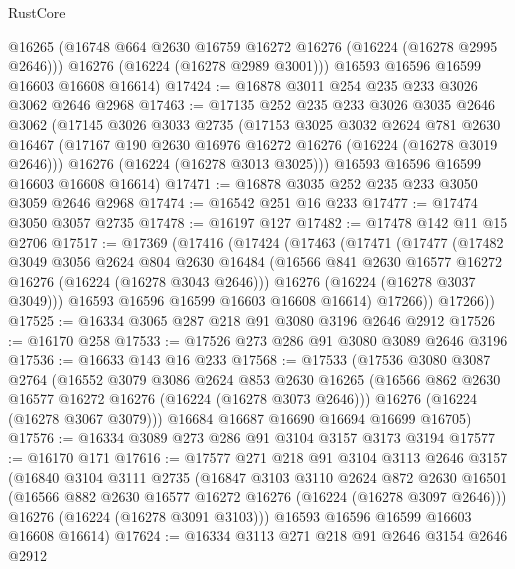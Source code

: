 \begin{lexlean}{RustCore}
\begin{coremodule}
        @16265
        (@16748 @664 @2630 @16759 @16272 @16276 (@16224 (@16278 @2995 @2646)))
        @16276
        (@16224 (@16278 @2989 @3001)))
      @16593
      @16596
      @16599
      @16603
      @16608
      @16614)
@17424 := @16878 @3011 @254 @235 @233 @3026 @3062 @2646 @2968
@17463 := @17135
    @252
    @235
    @233
    @3026
    @3035
    @2646
    @3062
    (@17145
      @3026
      @3033
      @2735
      (@17153
        @3025
        @3032
        @2624
        @781
        @2630
        @16467
        (@17167 @190 @2630 @16976 @16272 @16276 (@16224 (@16278 @3019 @2646)))
        @16276
        (@16224 (@16278 @3013 @3025)))
      @16593
      @16596
      @16599
      @16603
      @16608
      @16614)
@17471 := @16878 @3035 @252 @235 @233 @3050 @3059 @2646 @2968
@17474 := @16542 @251 @16 @233
@17477 := @17474 @3050 @3057 @2735
@17478 := @16197 @127
@17482 := @17478 @142 @11 @15 @2706
@17517 := @17369
    (@17416
      (@17424
        (@17463
          (@17471
            (@17477
              (@17482
                @3049
                @3056
                @2624
                @804
                @2630
                @16484
                (@16566 @841 @2630 @16577 @16272 @16276 (@16224 (@16278 @3043 @2646)))
                @16276
                (@16224 (@16278 @3037 @3049)))
              @16593
              @16596
              @16599
              @16603
              @16608
              @16614)
            @17266))
        @17266))
@17525 := @16334 @3065 @287 @218 @91 @3080 @3196 @2646 @2912
@17526 := @16170 @258
@17533 := @17526 @273 @286 @91 @3080 @3089 @2646 @3196
@17536 := @16633 @143 @16 @233
@17568 := @17533
    (@17536
      @3080
      @3087
      @2764
      (@16552
        @3079
        @3086
        @2624
        @853
        @2630
        @16265
        (@16566 @862 @2630 @16577 @16272 @16276 (@16224 (@16278 @3073 @2646)))
        @16276
        (@16224 (@16278 @3067 @3079)))
      @16684
      @16687
      @16690
      @16694
      @16699
      @16705)
@17576 := @16334 @3089 @273 @286 @91 @3104 @3157 @3173 @3194
@17577 := @16170 @171
@17616 := @17577
    @271
    @218
    @91
    @3104
    @3113
    @2646
    @3157
    (@16840
      @3104
      @3111
      @2735
      (@16847
        @3103
        @3110
        @2624
        @872
        @2630
        @16501
        (@16566 @882 @2630 @16577 @16272 @16276 (@16224 (@16278 @3097 @2646)))
        @16276
        (@16224 (@16278 @3091 @3103)))
      @16593
      @16596
      @16599
      @16603
      @16608
      @16614)
@17624 := @16334 @3113 @271 @218 @91 @2646 @3154 @2646 @2912

\end{coremodule}
\end{lexlean}
